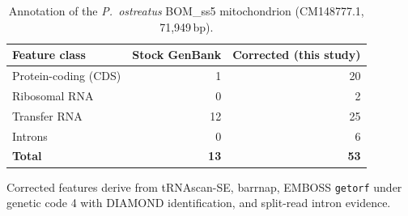 \begin{table}[htbp]
\caption{Annotation of the \textit{P.\ ostreatus} BOM\_ss5 mitochondrion (CM148777.1, 71{,}949\,bp).}\label{tab:mitoann}
\footnotesize
\begin{tabular}{@{}lrr@{}}
\toprule
Feature class & Stock GenBank & Corrected (this study) \\
\midrule
Protein-coding (CDS) & 1 & 20 \\
Ribosomal RNA & 0 & 2 \\
Transfer RNA & 12 & 25 \\
Introns & 0 & 6 \\
\textbf{Total} & \textbf{13} & \textbf{53} \\
\bottomrule
\end{tabular}
\begin{tablenotes}[flushleft]\footnotesize\item Corrected features derive from tRNAscan-SE, barrnap, EMBOSS \texttt{getorf} under genetic code 4 with DIAMOND identification, and split-read intron evidence.\end{tablenotes}
\end{table}
